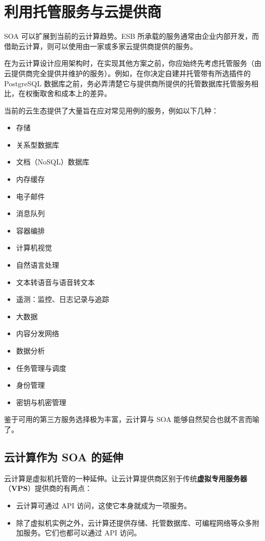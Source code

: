 \section{利用托管服务与云提供商}

\label{idx:1453}
\label{idx:1454}
SOA 可以扩展到当前的云计算趋势。ESB 所承载的服务通常由企业内部开发，而借助云计算，则可以使用由一家或多家云提供商提供的服务。

在为云计算设计应用架构时，在实现其他方案之前，你应始终先考虑托管服务（由云提供商完全提供并维护的服务）。例如，在你决定自建并托管带有所选插件的 PostgreSQL 数据库之前，务必弄清楚它与提供商所提供的托管数据库托管服务相比，在权衡取舍和成本上的差异。

当前的云生态提供了大量旨在应对常见用例的服务，例如以下几种：

\begin{itemize}
\item 存储
\item 关系型数据库
\item 文档（NoSQL）数据库
\item 内存缓存
\item 电子邮件
\item 消息队列
\item 容器编排
\item 计算机视觉
\item 自然语言处理
\item 文本转语音与语音转文本
\item 遥测：监控、日志记录与追踪
\item 大数据
\item 内容分发网络
\item 数据分析
\item 任务管理与调度
\item 身份管理
\label{idx:1455}
\label{idx:1456}
\item 密钥与机密管理
\end{itemize}

鉴于可用的第三方服务选择极为丰富，云计算与 SOA 能够自然契合也就不言而喻了。

\subsection{云计算作为 SOA 的延伸}

\label{idx:1457}
\label{idx:1458}
云计算是虚拟机托管的一种延伸。让云计算提供商区别于传统\textbf{虚拟专用服务器}（\textbf{VPS}）提供商的有两点：

\begin{itemize}
\item 云计算可通过 API 访问，这使它本身就成为一项服务。
\label{idx:1459}
\item 除了虚拟机实例之外，云计算还提供存储、托管数据库、可编程网络等众多附加服务。它们也都可以通过 API 访问。
\end{itemize}

